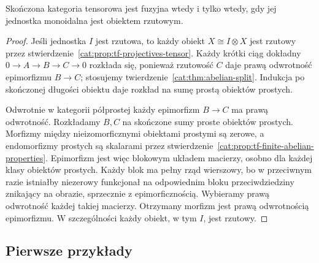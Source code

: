 \begin{wniosek}\label{cat:cor:tf-unit-projective}
Skończona kategoria tensorowa jest fuzyjna wtedy i tylko wtedy, gdy jej jednostka monoidalna jest obiektem rzutowym.
\end{wniosek}
\begin{proof}
Jeśli jednostka $I$ jest rzutowa, to każdy obiekt $X\cong I\otimes X$ jest rzutowy przez stwierdzenie~\ref{cat:prop:tf-projectives-tensor}. Każdy krótki ciąg dokładny $0\to A\to B\to C\to0$ rozkłada się, ponieważ rzutowość $C$ daje prawą odwrotność epimorfizmu $B\to C$; stosujemy twierdzenie~\ref{cat:thm:abelian-split}. Indukcja po skończonej długości obiektu daje rozkład na sumę prostą obiektów prostych.

Odwrotnie w kategorii półprostej każdy epimorfizm $B\to C$ ma prawą odwrotność. Rozkładamy $B,C$ na skończone sumy proste obiektów prostych. Morfizmy między nieizomorficznymi obiektami prostymi są zerowe, a endomorfizmy prostych są skalarami przez stwierdzenie~\ref{cat:prop:tf-finite-abelian-properties}. Epimorfizm jest więc blokowym układem macierzy, osobno dla każdej klasy obiektów prostych. Każdy blok ma pełny rząd wierszowy, bo w przeciwnym razie istniałby niezerowy funkcjonał na odpowiednim bloku przeciwdziedziny znikający na obrazie, sprzecznie z epimorficznością. Wybieramy prawą odwrotność każdej takiej macierzy. Otrzymany morfizm jest prawą odwrotnością epimorfizmu. W szczególności każdy obiekt, w tym $I$, jest rzutowy.
\end{proof}

\subsection{Pierwsze przykłady}

